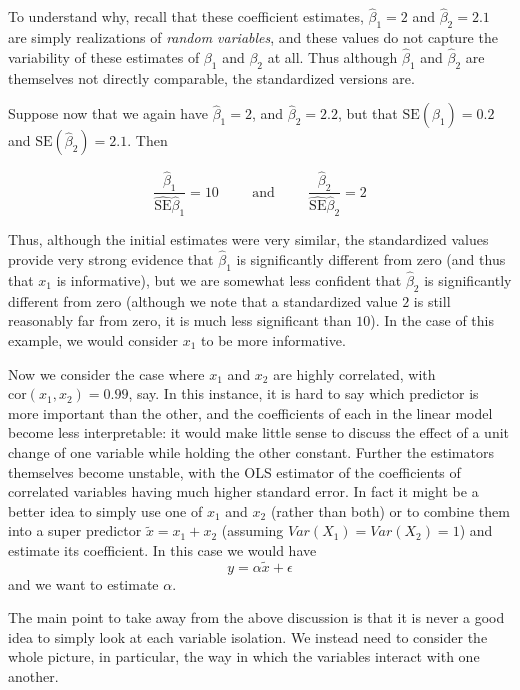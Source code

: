 To understand why, recall that these coefficient estimates, $\hat{\beta}_1 = 2$ and $\hat{\beta}_2 = 2.1$ are simply realizations of \textit{random variables}, and these values do not capture the variability of these estimates of $\beta_1$ and $\beta_2$ at all. Thus although $\hat{\beta}_1$ and $\hat{\beta}_2$ are themselves not directly comparable, the standardized versions are.

Suppose now that we again have $\hat{\beta}_1 = 2$, and $\hat{\beta}_2 = 2.2$, but that $\text{SE}(\hat{\beta}_1) = 0.2$ and $\text{SE}(\hat{\beta}_2) = 2.1$. Then 

$$\frac{\hat{\beta}_1}{\hat{\text{SE}}{\hat{\beta}_1}} = 10 \hspace{1cm} \text{and} \hspace{1cm} \frac{\hat{\beta}_2}{\hat{\text{SE}}{\hat{\beta}_2}} = 2$$

Thus, although the initial estimates were very similar, the standardized values provide very strong evidence that $\hat{\beta}_1$ is significantly different from zero (and thus that $x_1$ is informative), but we are somewhat less confident that $\hat{\beta}_2$ is significantly different from zero (although we note that a standardized value $2$ is still reasonably far from zero, it is much less significant than $10$). In the case of this example, we would consider $x_1$ to be more informative.

Now we consider the case where $x_1$ and $x_2$ are highly correlated, with $\text{cor}(x_1,x_2) = 0.99$, say. In this instance, it is hard to say which predictor is more important than the other, and the coefficients of each in the linear model become less interpretable: it would make little sense to discuss the effect of a unit change of one variable while holding the other constant. Further the estimators themselves become unstable, with the OLS estimator of the coefficients of correlated variables having much higher standard error. In fact it might be a better idea to simply use one of $x_1$ and $x_2$ (rather than both) or to combine them into a super predictor $\tilde{x} = x_1 + x_2$ (assuming $Var(X_1) = Var(X_2) = 1$) and estimate its coefficient. In this case we would have
$$ y = \alpha \tilde{x} + \epsilon$$
and we want to estimate $\alpha$.

The main point to take away from the above discussion is that it is never a good idea to simply look at each variable isolation. We instead need to consider the whole picture, in particular, the way in which the variables interact with one another.



